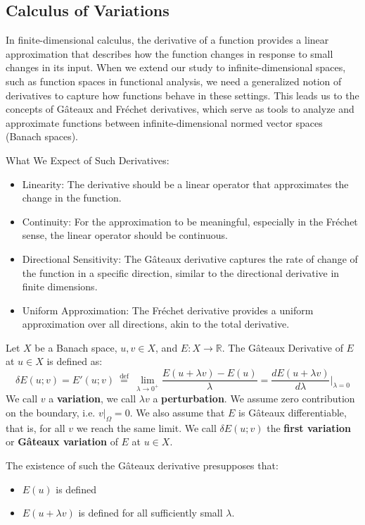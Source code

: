 \documentclass{article}
\begin{document}
\subsection{Calculus of Variations}
In finite-dimensional calculus, the derivative of a function provides a linear approximation that describes how the function changes in response to small changes in its input. When we extend our study to infinite-dimensional spaces, such as function spaces in functional analysis, we need a generalized notion of derivatives to capture how functions behave in these settings. This leads us to the concepts of Gâteaux and Fréchet derivatives, which serve as tools to analyze and approximate functions between infinite-dimensional normed vector spaces (Banach spaces).

What We Expect of Such Derivatives:
\begin{itemize}

  \item  Linearity: The derivative should be a linear operator that approximates the change in the function.
  \item Continuity: For the approximation to be meaningful, especially in the Fréchet sense, the linear operator should be continuous.
  \item  Directional Sensitivity: The Gâteaux derivative captures the rate of change of the function in a specific direction, similar to the directional derivative in finite dimensions.
\item  Uniform Approximation: The Fréchet derivative provides a uniform approximation over all directions, akin to the total derivative.
\end{itemize}



\begin{definition}  Let $X$ be a Banach space, $u,v \in X$, and $E: X \to \mathbb{R}$. The Gâteaux Derivative of $E$ at $u \in X$ is defined as:
\[
  \delta E(u ; v) =   E'(u ; v) \stackrel{\text{ def }}{=}  \lim_{\lambda \to 0^{+}} \frac{E(u + \lambda v) -E(u)}{\lambda} = \frac{d E(u + \lambda v)}{d \lambda} \Big|_{\lambda=0} 
\]
We call $v$ a \textbf{variation}, we call \textit{$\lambda v$} a \textbf{perturbation}. 
We  assume zero contribution on the boundary, i.e. $v|_{\Omega} = 0$. 
We also assume that $E$ is Gâteaux differentiable, that is, for all $v$ we reach the same limit.  
We call $\delta E(u ; v)$ the \textbf{first variation} or \textbf{Gâteaux variation} of $E$ at $u \in X$. 

The existence of such the Gâteaux derivative presupposes that:
\begin{itemize}
  \item $E(u)$ is defined 
  \item $E(u + \lambda v)$ is defined for all sufficiently small $\lambda$. 
\end{itemize}
\end{definition}
\end{document}
